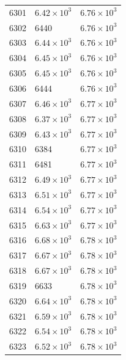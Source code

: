 \begin{table}[H]
\begin{tabular}{lll}
6301 & $\displaystyle 6.42 \times 10^{3}$ & $\displaystyle 6.76 \times 10^{3}$ \\
6302 & 6440 & $\displaystyle 6.76 \times 10^{3}$ \\
6303 & $\displaystyle 6.44 \times 10^{3}$ & $\displaystyle 6.76 \times 10^{3}$ \\
6304 & $\displaystyle 6.45 \times 10^{3}$ & $\displaystyle 6.76 \times 10^{3}$ \\
6305 & $\displaystyle 6.45 \times 10^{3}$ & $\displaystyle 6.76 \times 10^{3}$ \\
6306 & 6444 & $\displaystyle 6.76 \times 10^{3}$ \\
6307 & $\displaystyle 6.46 \times 10^{3}$ & $\displaystyle 6.77 \times 10^{3}$ \\
6308 & $\displaystyle 6.37 \times 10^{3}$ & $\displaystyle 6.77 \times 10^{3}$ \\
6309 & $\displaystyle 6.43 \times 10^{3}$ & $\displaystyle 6.77 \times 10^{3}$ \\
6310 & 6384 & $\displaystyle 6.77 \times 10^{3}$ \\
6311 & 6481 & $\displaystyle 6.77 \times 10^{3}$ \\
6312 & $\displaystyle 6.49 \times 10^{3}$ & $\displaystyle 6.77 \times 10^{3}$ \\
6313 & $\displaystyle 6.51 \times 10^{3}$ & $\displaystyle 6.77 \times 10^{3}$ \\
6314 & $\displaystyle 6.54 \times 10^{3}$ & $\displaystyle 6.77 \times 10^{3}$ \\
6315 & $\displaystyle 6.63 \times 10^{3}$ & $\displaystyle 6.77 \times 10^{3}$ \\
6316 & $\displaystyle 6.68 \times 10^{3}$ & $\displaystyle 6.78 \times 10^{3}$ \\
6317 & $\displaystyle 6.67 \times 10^{3}$ & $\displaystyle 6.78 \times 10^{3}$ \\
6318 & $\displaystyle 6.67 \times 10^{3}$ & $\displaystyle 6.78 \times 10^{3}$ \\
6319 & 6633 & $\displaystyle 6.78 \times 10^{3}$ \\
6320 & $\displaystyle 6.64 \times 10^{3}$ & $\displaystyle 6.78 \times 10^{3}$ \\
6321 & $\displaystyle 6.59 \times 10^{3}$ & $\displaystyle 6.78 \times 10^{3}$ \\
6322 & $\displaystyle 6.54 \times 10^{3}$ & $\displaystyle 6.78 \times 10^{3}$ \\
6323 & $\displaystyle 6.52 \times 10^{3}$ & $\displaystyle 6.78 \times 10^{3}$ \\

\end{tabular}
\end{table}

